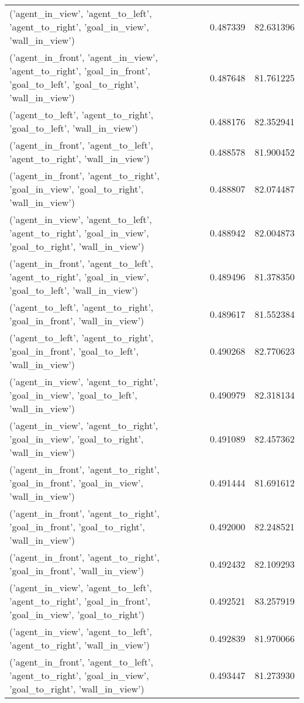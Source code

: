 \begin{tabular}{lrr}
('agent\_in\_view', 'agent\_to\_left', 'agent\_to\_right', 'goal\_in\_view', 'wall\_in\_view') & 0.487339 & 82.631396 \\
('agent\_in\_front', 'agent\_in\_view', 'agent\_to\_right', 'goal\_in\_front', 'goal\_to\_left', 'goal\_to\_right', 'wall\_in\_view') & 0.487648 & 81.761225 \\
('agent\_to\_left', 'agent\_to\_right', 'goal\_to\_left', 'wall\_in\_view') & 0.488176 & 82.352941 \\
('agent\_in\_front', 'agent\_to\_left', 'agent\_to\_right', 'wall\_in\_view') & 0.488578 & 81.900452 \\
('agent\_in\_front', 'agent\_to\_right', 'goal\_in\_view', 'goal\_to\_right', 'wall\_in\_view') & 0.488807 & 82.074487 \\
('agent\_in\_view', 'agent\_to\_left', 'agent\_to\_right', 'goal\_in\_view', 'goal\_to\_right', 'wall\_in\_view') & 0.488942 & 82.004873 \\
('agent\_in\_front', 'agent\_to\_left', 'agent\_to\_right', 'goal\_in\_view', 'goal\_to\_left', 'wall\_in\_view') & 0.489496 & 81.378350 \\
('agent\_to\_left', 'agent\_to\_right', 'goal\_in\_front', 'wall\_in\_view') & 0.489617 & 81.552384 \\
('agent\_to\_left', 'agent\_to\_right', 'goal\_in\_front', 'goal\_to\_left', 'wall\_in\_view') & 0.490268 & 82.770623 \\
('agent\_in\_view', 'agent\_to\_right', 'goal\_in\_view', 'goal\_to\_left', 'wall\_in\_view') & 0.490979 & 82.318134 \\
('agent\_in\_view', 'agent\_to\_right', 'goal\_in\_view', 'goal\_to\_right', 'wall\_in\_view') & 0.491089 & 82.457362 \\
('agent\_in\_front', 'agent\_to\_right', 'goal\_in\_front', 'goal\_in\_view', 'wall\_in\_view') & 0.491444 & 81.691612 \\
('agent\_in\_front', 'agent\_to\_right', 'goal\_in\_front', 'goal\_to\_right', 'wall\_in\_view') & 0.492000 & 82.248521 \\
('agent\_in\_front', 'agent\_to\_right', 'goal\_in\_front', 'wall\_in\_view') & 0.492432 & 82.109293 \\
('agent\_in\_view', 'agent\_to\_left', 'agent\_to\_right', 'goal\_in\_front', 'goal\_in\_view', 'goal\_to\_right') & 0.492521 & 83.257919 \\
('agent\_in\_view', 'agent\_to\_left', 'agent\_to\_right', 'wall\_in\_view') & 0.492839 & 81.970066 \\
('agent\_in\_front', 'agent\_to\_left', 'agent\_to\_right', 'goal\_in\_view', 'goal\_to\_right', 'wall\_in\_view') & 0.493447 & 81.273930 \\

\end{tabular}
